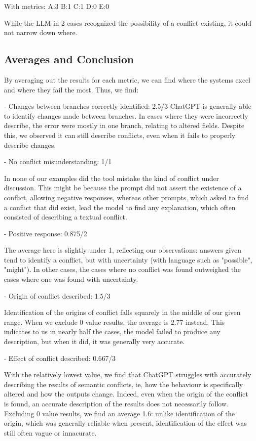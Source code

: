 With metrics:
A:3
B:1
C:1
D:0
E:0

While the LLM in 2 cases recognized the possibility of a conflict existing, it could not narrow down where.

\subsection{Averages and Conclusion}

By averaging out the results for each metric, we can find where the systems excel and where they fail the most. Thus, we find:

- Changes between branches correctly identified: 2.5/3
ChatGPT is generally able to identify changes made between branches. In cases where they were incorrectly describe, the error were mostly in one branch, relating to altered fields. Despite this, we observed it can still describe conflicts, even when it fails to properly describe changes.

- No conflict misunderstanding: 1/1

In none of our examples did the tool mistake the kind of conflict under discussion. This might be because the prompt did not assert the existence of a conflict, allowing negative responses, whereas other prompts, which asked to find a conflict that did exist, lead the model to find any explanation, which often consisted of describing a textual conflict.

- Positive response: 0.875/2

The average here is slightly under 1, reflecting our observations: answers given tend to identify a conflict, but with uncertainty (with language such as "possible", "might"). In other cases, the cases where no conflict was found outweighed the cases where one was found with uncertainty.

- Origin of conflict described: 1.5/3

Identification of the origins of conflict falls squarely in the middle of our given range.  When we exclude 0 value results, the average is 2.77 instead. This indicates to us in nearly half the cases, the model failed to produce any description, but when it did, it was generally very accurate.

- Effect of conflict described: 0.667/3

With the relatively lowest value, we find that ChatGPT struggles with accurately describing the results of semantic conflicts, ie, how the behaviour is specifically altered and how the outputs change. Indeed, even when the origin of the conflict is found, an accurate description of the results does not necessarily follow. Excluding 0 value results, we find an average 1.6: unlike identification of the origin, which was generally reliable when present, identification of the effect was still often vague or innacurate.




